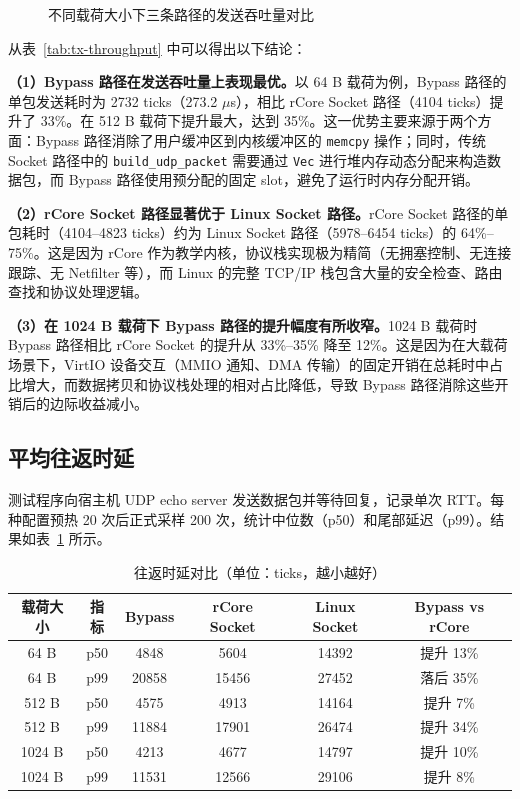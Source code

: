 \begin{figure}[htbp]
    \centering
    \caption{不同载荷大小下三条路径的发送吞吐量对比}
    \label{fig:tx-throughput}
\end{figure}

从表~\ref{tab:tx-throughput} 中可以得出以下结论：

\textbf{（1）Bypass 路径在发送吞吐量上表现最优。}以 64 B 载荷为例，Bypass 路径的单包发送耗时为 2732 ticks（273.2 $\mu$s），相比 rCore Socket 路径（4104 ticks）提升了 33\%。在 512 B 载荷下提升最大，达到 35\%。这一优势主要来源于两个方面：Bypass 路径消除了用户缓冲区到内核缓冲区的 \texttt{memcpy} 操作；同时，传统 Socket 路径中的 \texttt{build\_udp\_packet} 需要通过 \texttt{Vec} 进行堆内存动态分配来构造数据包，而 Bypass 路径使用预分配的固定 slot，避免了运行时内存分配开销。

\textbf{（2）rCore Socket 路径显著优于 Linux Socket 路径。}rCore Socket 路径的单包耗时（4104--4823 ticks）约为 Linux Socket 路径（5978--6454 ticks）的 64\%--75\%。这是因为 rCore 作为教学内核，协议栈实现极为精简（无拥塞控制、无连接跟踪、无 Netfilter 等），而 Linux 的完整 TCP/IP 栈包含大量的安全检查、路由查找和协议处理逻辑。

\textbf{（3）在 1024 B 载荷下 Bypass 路径的提升幅度有所收窄。}1024 B 载荷时 Bypass 路径相比 rCore Socket 的提升从 33\%--35\% 降至 12\%。这是因为在大载荷场景下，VirtIO 设备交互（MMIO 通知、DMA 传输）的固定开销在总耗时中占比增大，而数据拷贝和协议栈处理的相对占比降低，导致 Bypass 路径消除这些开销后的边际收益减小。

\subsection{平均往返时延}

测试程序向宿主机 UDP echo server 发送数据包并等待回复，记录单次 RTT。每种配置预热 20 次后正式采样 200 次，统计中位数（p50）和尾部延迟（p99）。结果如表~\ref{tab:rtt} 所示。

\begin{table}[htbp]
    \centering
    \caption{往返时延对比（单位：ticks，越小越好）}
    \label{tab:rtt}
    \begin{tabular}{cccccc}
        \toprule
        载荷大小 & 指标 & Bypass & rCore Socket & Linux Socket & Bypass vs rCore \\
        \midrule
        64 B   & p50 & 4848  & 5604  & 14392 & 提升 13\% \\
        64 B   & p99 & 20858 & 15456 & 27452 & 落后 35\% \\
        512 B  & p50 & 4575  & 4913  & 14164 & 提升 7\% \\
        512 B  & p99 & 11884 & 17901 & 26474 & 提升 34\% \\
        1024 B & p50 & 4213  & 4677  & 14797 & 提升 10\% \\
        1024 B & p99 & 11531 & 12566 & 29106 & 提升 8\% \\
        \bottomrule
    \end{tabular}
\end{table}

